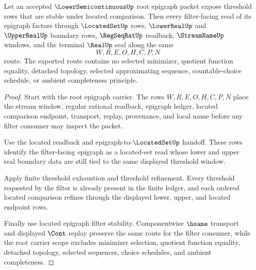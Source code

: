 \begin{theorem}
\label{thm:lowersemicontinuous-epigraph-filter-route}
Let an accepted $\LowerSemicontinuousUp$ root epigraph packet expose threshold rows that are stable under located comparison. Then every filter-facing read of its epigraph factors through $\LocatedSetUp$ rows, $\LowerRealUp$ and $\UpperRealUp$ boundary rows, $\RegSeqRatUp$ readback, $\StreamNameUp$ windows, and the terminal $\RealUp$ seal along the same
$$
W,R,E,O,H,C,P,N
$$
route. The exported route contains no selected minimizer, quotient function equality, detached topology, selected approximating sequence, countable-choice schedule, or ambient completeness principle.
\end{theorem}
\begin{proof}
Start with the root epigraph carrier. The rows $W,R,E,O,H,C,P,N$ place the stream window, regular rational readback, epigraph ledger, located comparison endpoint, transport, replay, provenance, and local name before any filter consumer may inspect the packet.

Use the located readback and epigraph-to-$\LocatedSetUp$ handoff. These rows identify the filter-facing epigraph as a located-set read whose lower and upper real boundary data are still tied to the same displayed threshold window.

Apply finite threshold exhaustion and threshold refinement. Every threshold requested by the filter is already present in the finite ledger, and each ordered located comparison refines through the displayed lower, upper, and located endpoint rows.

Finally use located epigraph filter stability. Componentwise $\hsame$ transport and displayed $\Cont$ replay preserve the same route for the filter consumer, while the root carrier scope excludes minimizer selection, quotient function equality, detached topology, selected sequences, choice schedules, and ambient completeness.
\end{proof}

